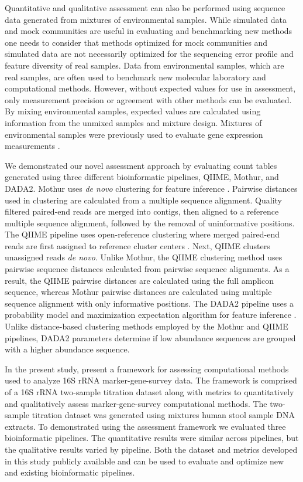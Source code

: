 \documentclass{bmcart}
\begin{document}
Quantitative and qualitative assessment can also be performed using
sequence data generated from mixtures of environmental samples. While
simulated data and mock communities are useful in evaluating and
benchmarking new methods one needs to consider that methods optimized
for mock communities and simulated data are not necessarily optimized
for the sequencing error profile and feature diversity of real samples.
Data from environmental samples, which are real samples, are often used
to benchmark new molecular laboratory and computational methods.
However, without expected values for use in assessment, only measurement
precision or agreement with other methods can be evaluated. By mixing
environmental samples, expected values are calculated using information
from the unmixed samples and mixture design. Mixtures of environmental
samples were previously used to evaluate gene expression measurements
\cite{parsons2015using, pine2011adaptable, thompson2005use}.


We demonstrated our novel assessment approach by evaluating count tables
generated using three different bioinformatic pipelines, QIIME, Mothur, and
DADA2. Mothur uses \emph{de novo} clustering for feature
inference \cite{westcott2017opticlust, schloss2009introducing}.
Pairwise distances used in clustering are calculated from a multiple
sequence alignment. Quality filtered paired-end reads are merged
into contigs, then aligned to a reference multiple
sequence alignment, followed by the removal of uninformative positions.
The QIIME pipeline uses open-reference clustering
where merged paired-end reads are first assigned to reference cluster
centers \cite{Rideout2014, Caporaso2010}. Next, QIIME clusters
unassigned reads \emph{de novo}. Unlike Mothur, the QIIME clustering
method uses pairwise sequence distances calculated from pairwise
sequence alignments. As a result, the QIIME pairwise distances are
calculated using the full amplicon sequence, whereas
Mothur pairwise distances are calculated using multiple
sequence alignment with only informative positions.
The DADA2 pipeline uses a probability model and
maximization expectation algorithm for feature inference
\cite{callahan2016dada2}. Unlike distance-based clustering methods
employed by the Mothur and QIIME pipelines, DADA2 parameters determine
if low abundance sequences are grouped with a higher abundance sequence.

In the present study, present a framework for assessing computational methods used to
analyze 16S rRNA marker-gene-survey data. The framework is comprised of a 16S rRNA
two-sample titration dataset along with metrics to quantitatively and qualitatively assess
marker-gene-survey computational methods.
The two-sample titration dataset was generated using mixtures human stool sample DNA extracts.
To demonstrated using the assessment framework we evaluated three bioinformatic pipelines.
The quantitative results were similar across pipelines, but the qualitative results varied by pipeline.
Both the dataset and metrics developed in this study publicly available and can be used to evaluate and optimize
new and existing bioinformatic pipelines.
\end{document}
